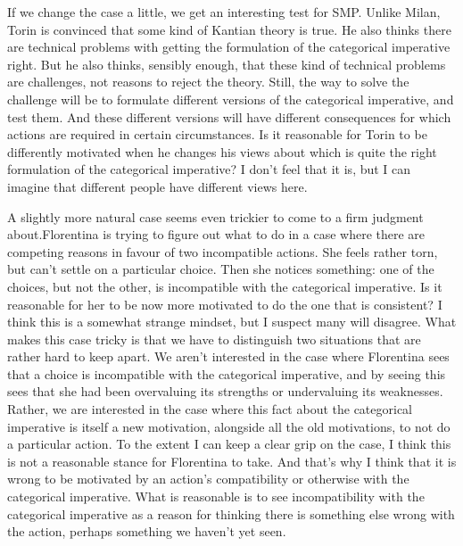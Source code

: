 If we change the case a little, we get an interesting test for SMP. Unlike \gls{Milan}, \gls{Torin} is convinced that some kind of Kantian theory is true. He also thinks there are technical problems with getting the formulation of the categorical imperative right. But he also thinks, sensibly enough, that these kind of technical problems are challenges, not reasons to reject the theory. Still, the way to solve the challenge will be to formulate different versions of the categorical imperative, and test them. And these different versions will have different consequences for which actions are required in certain circumstances. Is it reasonable for \gls{Torin} to be differently motivated when he changes his views about which is quite the right formulation of the categorical imperative? I don't feel that it is, but I can imagine that different people have different views here.

A slightly more natural case seems even trickier to come to a firm judgment about.\gls{Florentina} is trying to figure out what to do in a case where there are competing reasons in favour of two incompatible actions. She feels rather torn, but can't settle on a particular choice. Then she notices something: one of the choices, but not the other, is incompatible with the categorical imperative. Is it reasonable for her to be now more motivated to do the one that is consistent? I think this is a somewhat strange mindset, but I suspect many will disagree. What makes this case tricky is that we have to distinguish two situations that are rather hard to keep apart. We aren't interested in the case where \gls{Florentina} sees that a choice is incompatible with the categorical imperative, and by seeing this sees that she had been overvaluing its strengths or undervaluing its weaknesses. Rather, we are interested in the case where this fact about the categorical imperative is itself a new motivation, alongside all the old motivations, to not do a particular action. To the extent I can keep a clear grip on the case, I think this is not a reasonable stance for \gls{Florentina} to take. And that's why I think that it is wrong to be motivated by an action's compatibility or otherwise with the categorical imperative. What is reasonable is to see incompatibility with the categorical imperative as a reason for thinking there is something else wrong with the action, perhaps something we haven't yet seen.

